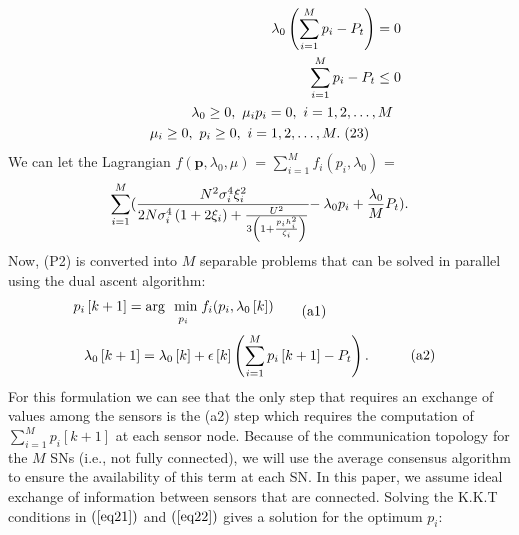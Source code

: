 \documentclass[conference]{IEEEtran}
\begin{document}
\vspace{-0.7cm}
\begin{align*}\label{eq22}
\lambda_0 \left(\sum \limits_{i=1}^M p_i- P_t\right)=0 \hspace{-0.8cm}\\
\sum \limits_{i=1}^M p_i- P_t \leq0 \hspace{-0.8cm}\\
\lambda_0\geq 0 , \ \mu_i p_i=0,  \ i = 1, 2, \ldots, M \hspace{-0.6cm} \\
\mu_i\geq0, \  p_i\geq0,  \ i = 1, 2, \ldots, M. \hspace{-0.6cm}
\tag{23}
\end{align*}
We can let the Lagrangian $f(\boldsymbol p, \lambda_0, \mu)$ = $\sum \limits_{i=1}^M f_i(p_i, \lambda_0)$ =
\begin{align*}
{\sum \limits_{i=1}^M ( {\frac{ N^2 \sigma_i^{4}\xi_i ^{2}}{ {   2N  \sigma_i^{4} \left(1+2\xi_i \right) +\frac{U^{2}}{3\left(1+\frac{p_ih_i^{2}}{\zeta_i}\right)}}}\hspace{-0.1cm}}  -\lambda_0 p_i+ \frac{\lambda_0}{M} P_t)}.
\end{align*}
Now, (P2) is converted into $M$ separable  problems that can be solved in parallel using the dual ascent algorithm:
\begin{equation*}\label{eq30}
\vspace{-0.1cm}
\begin{aligned}
\hspace{-3cm}p_i\left[k+1\right]=\underset{\hspace{0.6cm} p_i}{\text{arg \ min}}\hspace{0.1cm}f_i(p_i, \lambda_0\left[k\right]) \\ 
\end{aligned}
\tag{{a1}}
\vspace{-0.1cm}
\end{equation*}
\begin{equation*}\label{eq30}
\begin{aligned}
 &\lambda_0\left[k+1\right]=\lambda_0\left[k\right]+\epsilon\left[k\right]\left(\sum \limits_{i=1}^M p_i\left[k+1\right]-P_t\right).
\end{aligned}
\tag{{a2}}
\end{equation*}
For this formulation we can see that the only step that requires an exchange of values among the sensors is the (a2) step which requires the computation of $\sum \limits_{i=1}^M p_i\left[k+1\right]$ at each sensor node. Because of the communication topology for the $M$ SNs (i.e., not fully connected), we will use the average consensus algorithm \cite{saber} to ensure the availability of this term at each SN. In this paper, we assume ideal exchange of information between sensors that are connected. Solving the K.K.T conditions in $ (\ref{eq21})$ and $(\ref{eq22})$ gives a solution for the optimum $p_i$:
\end{document}
